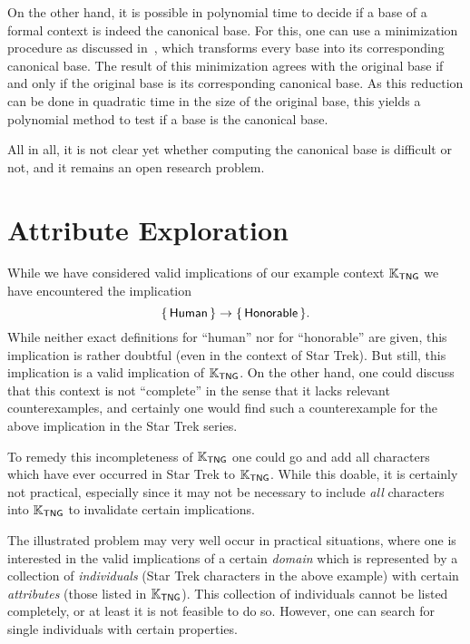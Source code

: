 On the other hand, it is possible in polynomial time to decide if a base of a formal
context is indeed the canonical base.  For this, one can use a minimization procedure as
discussed in~\cite{DBLP:conf/icfca/Rudolph07}, which transforms every base into its
corresponding canonical base.  The result of this minimization agrees with the original
base if and only if the original base is its corresponding canonical base.  As this
reduction can be done in quadratic time in the size of the original base, this yields a
polynomial method to test if a base is the canonical base.

All in all, it is not clear yet whether computing the canonical base is difficult or not,
and it remains an open research problem.

\section{Attribute Exploration}
\label{sec:attr-expl}

While we have considered valid implications of our example context ${\mathbb{K}}_{\mathsf{TNG}}$
we have encountered the implication
\begin{equation*}
  {\ensuremath{\{\, \mathsf{Human} \,\}}} \to {\ensuremath{\{\, \mathsf{Honorable} \,\}}}.
\end{equation*}
While neither exact definitions for ``human'' nor for ``honorable'' are given, this
implication is rather doubtful (even in the context of Star Trek).  But still, this
implication is a valid implication of ${\mathbb{K}}_{\mathsf{TNG}}$.  On the other hand, one
could discuss that this context is not ``complete'' in the sense that it lacks
relevant counterexamples, and certainly one would find such a counterexample for the above
implication in the Star Trek series.

To remedy this incompleteness of ${\mathbb{K}}_{\mathsf{TNG}}$ one could go and add all
characters which have ever occurred in Star Trek to ${\mathbb{K}}_{\mathsf{TNG}}$.  While this
doable, it is certainly not practical, especially since it may not be necessary to include
\emph{all} characters into ${\mathbb{K}}_{\mathsf{TNG}}$ to invalidate certain implications.

The illustrated problem may very well occur in practical situations, where one is
interested in the valid implications of a certain \emph{domain} which is represented by a
collection of \emph{individuals} (Star Trek characters in the above example) with certain
\emph{attributes} (those listed in ${\mathbb{K}}_{\mathsf{TNG}}$).  This collection of
individuals cannot be listed completely, or at least it is not feasible to do so.
However, one can search for single individuals with certain properties.

